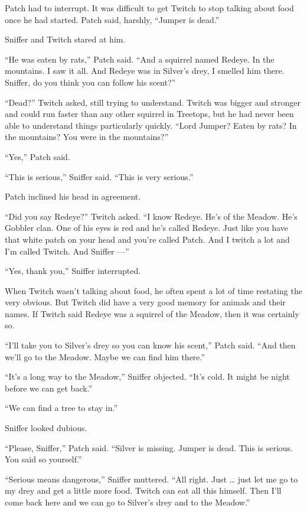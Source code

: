 \documentclass[ebook,oneside,openany,17pt]{memoir}
\begin{document}
Patch had to interrupt. It was difficult to get Twitch to stop talking
about food once he had started. Patch said, harshly, “Jumper is dead.”

Sniffer and Twitch stared at him.

“He was eaten by rats,” Patch said. “And a squirrel named Redeye. In
the mountains. I saw it all. And Redeye was in Silver’s drey, I
smelled him there. Sniffer, do you think you can follow his scent?”

“Dead?” Twitch asked, still trying to understand. Twitch was bigger
and stronger and could run faster than any other squirrel in Treetops,
but he had never been able to understand things particularly
quickly. “Lord Jumper? Eaten by rats? In the mountains? You were in
the mountains?”

“Yes,” Patch said.

“This is serious,” Sniffer said. “This is very serious.”

Patch inclined his head in agreement.

“Did you say Redeye?” Twitch asked. “I know Redeye. He’s of the
Meadow. He’s Gobbler clan. One of his eyes is red and he’s called
Redeye. Just like you have that white patch on your head and you’re
called Patch. And I twitch a lot and I’m called Twitch. And Sniffer —”

“Yes, thank you,” Sniffer interrupted.

When Twitch wasn’t talking about food, he often spent a lot of time
restating the very obvious. But Twitch did have a very good memory for
animals and their names. If Twitch said Redeye was a squirrel of the
Meadow, then it was certainly so.

“I’ll take you to Silver’s drey so you can know his scent,” Patch
said. “And then we’ll go to the Meadow. Maybe we can find him there.”

“It’s a long way to the Meadow,” Sniffer objected. “It’s cold. It
might be night before we can get back.”

“We can find a tree to stay in.”

Sniffer looked dubious.

“Please, Sniffer,” Patch said. “Silver is missing. Jumper is
dead. This is serious. You said so yourself.”

“Serious means dangerous,” Sniffer muttered. “All right. Just … just
let me go to my drey and get a little more food. Twitch can eat all
this himself. Then I’ll come back here and we can go to Silver’s drey
and to the Meadow.”
\end{document}
